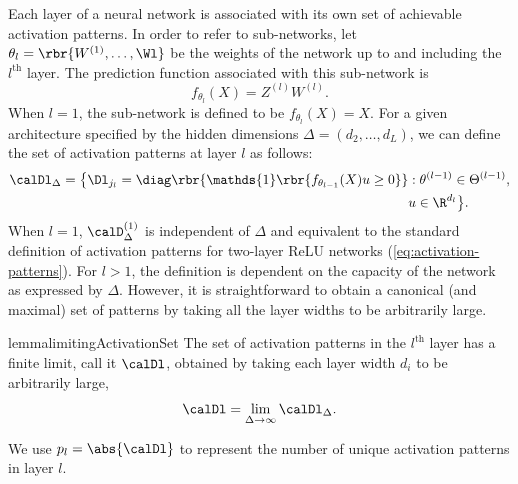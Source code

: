 Each layer of a neural network is associated with its own set of achievable
activation patterns.
In order to refer to sub-networks,
let \( \theta_l = \rbr{W^{(1)}, \ldots, \Wl} \) be the weights of the
network up to and including the \( l^{\text{th}} \) layer.
The prediction function associated with this sub-network is
\begin{equation}\label{eq:sub-network}
    f_{\theta_{l}}(X) = Z^{(l)} W^{(l)}.
\end{equation}
When \( l = 1 \), the sub-network is defined to be \( f_{\theta_{l}}(X) = X \).
For a given architecture specified by the hidden dimensions
\( \Delta = (d_2, \ldots, d_{L}) \), we can define the set of activation
patterns at layer \( l \) as follows:
\begin{equation}\label{eq:l-activation-patterns}
    \begin{aligned}
        \calDl_{\Delta} = \big\{
        \Dl_{j_l} =
        \diag\rbr{\mathds{1}\rbr{f_{\theta_{l-1}}(X) u \geq 0}}
         & : \theta^{(l-1)} \in \Theta^{(l-1)}, \\
         & u \in \R^{d_{l}}
        \big\}.
    \end{aligned}
\end{equation}
When \( l = 1 \), \( \calD^{(1)}_{\Delta} \) is independent of \( \Delta \)
and equivalent to the standard definition of activation patterns for two-layer
ReLU networks (\cref{eq:activation-patterns}).
For \( l > 1 \), the definition is dependent on the capacity of the network
as expressed by \( \Delta \).
However, it is straightforward to obtain a canonical (and maximal) set of
patterns by taking all the layer widths to be arbitrarily large.
\begin{restatable}{lemma}{limitingActivationSet}\label{lemma:activation-patterns}
    The set of activation patterns in the \( l^{\text{th}} \) layer has a
    finite limit, call it \( \calDl \), obtained by taking each layer width
    \( d_{i} \) to be arbitrarily large,
    \[
        \calDl = \lim_{\Delta \rightarrow \infty} \calDl_{\Delta}.
    \]
\end{restatable}
We use \( p_{l} = \abs{\calDl} \) to represent the number of unique activation
patterns in layer \( l \).

